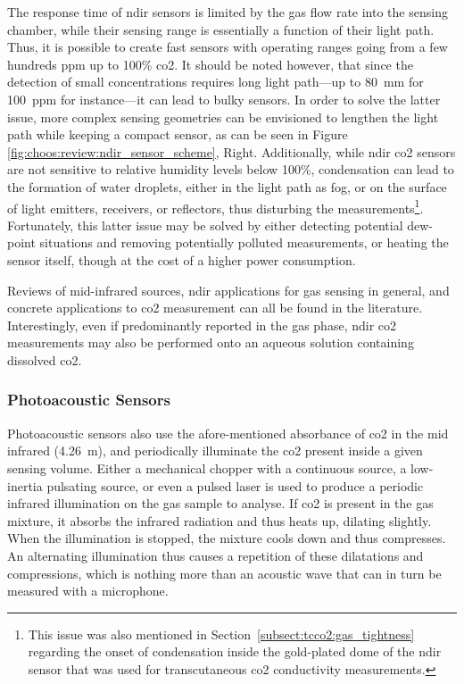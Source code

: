 The response time of \gls{ndir} sensors is limited by the gas flow rate into the sensing chamber, while their sensing range is essentially a function of their light path. Thus, it is possible to create fast sensors with operating ranges going from a few hundreds ppm up to 100\% \gls{co2}\cite{gibson2013, vincent2016}. It should be noted however, that since the detection of small concentrations requires long light path---up to 80~mm for 100~ppm for instance\cite{vincent2016}---it can lead to bulky sensors. In order to solve the latter issue, more complex sensing geometries can be envisioned to lengthen the light path while keeping a compact sensor, as can be seen in Figure \ref{fig:choos:review:ndir_sensor_scheme}, Right. Additionally, while \gls{ndir} \gls{co2} sensors are not sensitive to relative humidity levels below 100\%\cite{kohsiek1991, gibson2013}, condensation can lead to the formation of water droplets, either in the light path as fog, or on the surface of light emitters, receivers, or reflectors, thus disturbing the measurements\cite{vincent2016, muller2020}\footnote{This issue was also mentioned in Section~\ref{subsect:tcco2:gas_tightness} regarding the onset of condensation inside the gold-plated dome of the \gls{ndir} sensor that was used for transcutaneous \gls{co2} conductivity measurements.}. Fortunately, this latter issue may be solved by either detecting potential dew-point situations and removing potentially polluted measurements\cite{wang2018}, or heating the sensor itself, though at the cost of a higher power consumption\cite{fietzek2014, gss_condensation}.

Reviews of mid-infrared sources\cite{jung2017}, \gls{ndir} applications for gas sensing in general\cite{hodgkinson2012rev, popa2019}, and concrete applications to \gls{co2} measurement\cite{zhang2010, hodgkinson2013, moumen2016, vincent2016} can all be found in the literature. Interestingly, even if predominantly reported in the gas phase, \gls{ndir} \gls{co2} measurements may also be performed onto an aqueous solution containing dissolved \gls{co2}\cite{schaden2004}.

\subsubsection{Photoacoustic Sensors}\label{subsect:choos:review:photoacous}

Photoacoustic sensors also use the afore-mentioned absorbance of \gls{co2} in the mid infrared (4.26~\textmu{}m), and periodically illuminate the \gls{co2} present inside a given sensing volume. Either a mechanical chopper with a continuous source, a low-inertia pulsating source, or even a pulsed laser is used to produce a periodic infrared illumination on the gas sample to analyse. If \gls{co2} is present in the gas mixture, it absorbs the infrared radiation and thus heats up, dilating slightly. When the illumination is stopped, the mixture cools down and thus compresses. An alternating illumination thus causes a repetition of these dilatations and compressions, which is nothing more than an acoustic wave that can in turn be measured with a microphone\cite{bozoki2011}.


